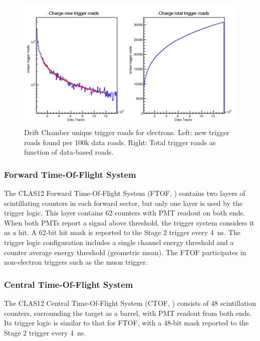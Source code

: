 \begin{figure}[hbt]
	\centering
	\includegraphics[width=1.0\columnwidth,keepaspectratio]{img/dc_neg_data_dictionary.png}
	\caption{Drift Chamber unique trigger roads for electrons. Left: new trigger roads found per 100k data roads. Right: Total trigger roads as function of data-based roads.}
	\label{fig:dc_neg_data_dictionary}
\end{figure}


\subsubsection{Forward Time-Of-Flight System}

The CLAS12 Forward Time-Of-Flight System (FTOF, \cite{ftof-ref}) contains two layers of scintillating counters in each forward sector, but only one layer is used by the trigger logic. This layer contains 62 counters with PMT readout on both ends. When both PMTs report a signal above threshold, the trigger system considers it as a hit. A 62-bit hit mask is reported to the Stage 2 trigger every 4~ns. The trigger logic configuration includes a single channel energy threshold and a counter average energy threshold (geometric mean). The FTOF participates in non-electron triggers such as the muon trigger.


\subsubsection{Central Time-Of-Flight System}

The CLAS12 Central Time-Of-Flight System (CTOF, \cite{ctof-ref}) consists of 48 scintillation counters, surrounding the target as a barrel, with PMT readout from both ends. Its trigger logic is similar to that for FTOF, with a 48-bit mask reported to the Stage 2 trigger every 4~ns.


